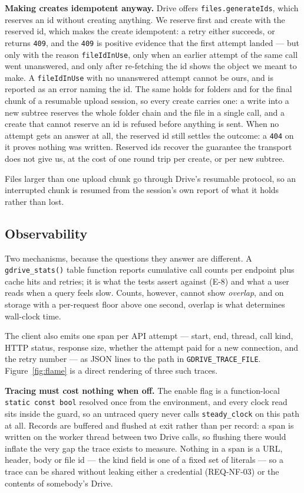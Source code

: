 \documentclass[sigconf, nonacm]{acmart}
\newcommand{\expref}[1]{\textsf{E-#1}}
\begin{document}
\textbf{Making creates idempotent anyway.}
Drive offers \texttt{files.generateIds}, which reserves an id without creating
anything. We reserve first and create with the reserved id, which makes the
create idempotent: a retry either succeeds, or returns \texttt{409}, and the
\texttt{409} is positive evidence that the first attempt landed --- but only
with the reason \texttt{fileIdInUse}, only when an earlier attempt of the same
call went unanswered, and only after re-fetching the id shows the object we
meant to make. A \texttt{fileIdInUse} with no unanswered attempt cannot be
ours, and is reported as an error naming the id. The same holds for folders and for the final
chunk of a resumable upload session, so every create carries one: a write into
a new subtree reserves the whole folder chain and the file in a single call,
and a create that cannot reserve an id is refused before anything is sent.
When no attempt gets an answer at all, the reserved id still settles the
outcome: a \texttt{404} on it proves nothing was written. Reserved ids recover
the guarantee the transport does not give us, at the cost of one round trip
per create, or per new subtree.

Files larger than one upload chunk go through Drive's resumable protocol, so an
interrupted chunk is resumed from the session's own report of what it holds
rather than lost.

\subsection{Observability}
\label{sec:tracing}

Two mechanisms, because the questions they answer are different. A
\texttt{gdrive\_stats()} table function reports cumulative call counts per
endpoint plus cache hits and retries; it is what the tests assert against
(\expref{8}) and what a user reads when a query feels slow. Counts, however,
cannot show \emph{overlap}, and on storage with a per-request floor above one
second, overlap is what determines wall-clock time.

The client also emits one span per API attempt --- start, end, thread, call
kind, HTTP status, response size, whether the attempt paid for a new
connection, and the retry number --- as JSON lines to the path in
\texttt{GDRIVE\_TRACE\_FILE}. Figure~\ref{fig:flame} is a direct rendering of
three such traces.

\textbf{Tracing must cost nothing when off.} The enable flag is a function-local
\texttt{static const bool} resolved once from the environment, and every clock
read sits inside the guard, so an untraced query never calls
\texttt{steady\_clock} on this path at all. Records are buffered and flushed at
exit rather than per record: a span is written on the worker thread between two
Drive calls, so flushing there would inflate the very gap the trace exists to
measure. Nothing in a span is a URL, header, body or file id --- the kind field
is one of a fixed set of literals --- so a trace can be shared without leaking
either a credential (REQ-NF-03) or the contents of somebody's Drive.
\end{document}
